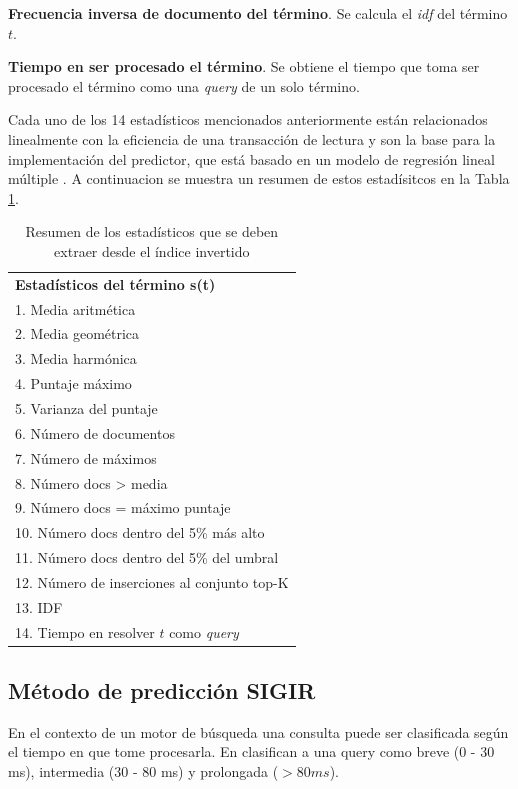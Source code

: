 \begin{list}{}{}
	\item \textbf{Frecuencia inversa de documento del término}. Se calcula el \textit{idf} del término $t$.
	
	\item \textbf{Tiempo en ser procesado el término}. Se obtiene el tiempo que toma ser procesado el término como una \textit{query} de un solo término.

\end{list}


Cada uno de los 14 estadísticos mencionados anteriormente están relacionados linealmente con la eficiencia de una transacción de lectura y son la base para la implementación del predictor, que está basado en un modelo de regresión lineal múltiple \citep{Chambers:1991}. A continuacion se muestra un resumen de estos estadísitcos en la Tabla \ref{tabla:estadisticosGlasgow}. 

\begin{table}[H]
\centering
\caption{Resumen de los estadísticos que se deben extraer desde el índice invertido}
\label{tabla:estadisticosGlasgow}
\begin{tabular}{|l|}
	\hline
	\textbf{Estadísticos del término s(t)} \\	
	1. Media aritmética	 \\ \hline
	2. Media geométrica	 \\ \hline
	3. Media harmónica	 \\ \hline
	4. Puntaje máximo	 \\ \hline
	5. Varianza del puntaje	 \\ \hline
	6. Número de documentos	 \\ \hline
	7. Número de máximos	 \\ \hline
	8. Número docs > media	 \\ \hline
	9. Número docs = máximo puntaje	 \\ \hline
	10. Número docs dentro del 5\% más alto	 \\ \hline
	11. Número docs dentro del 5\% del umbral	 \\ \hline
	12. Número de inserciones al conjunto top-K	 \\ \hline
	13. IDF	 \\ \hline
	14. Tiempo en resolver $t$ como \textit{query}	\\ \hline  
\end{tabular}
\end{table}


\subsection{Método de predicción SIGIR}
\label{scheduling:sigir}
En el contexto de un motor de búsqueda una consulta puede ser clasificada según el tiempo en que tome procesarla. En \citep{Jeon:2014} clasifican a una query como breve (0 - 30 ms), intermedia (30 - 80 ms) y prolongada ($ > 80 ms$). 


